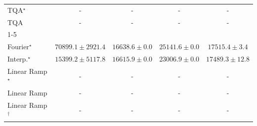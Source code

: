 \begin{tabular}{l|cccc|}
TQA$^\star$ & {\cellcolor[HTML]{000000}} \color[HTML]{F1F1F1} {\cellcolor{white}} \color{black} - & {\cellcolor[HTML]{000000}} \color[HTML]{F1F1F1} {\cellcolor{white}} \color{black} - & {\cellcolor[HTML]{000000}} \color[HTML]{F1F1F1} {\cellcolor{white}} \color{black} - & {\cellcolor[HTML]{000000}} \color[HTML]{F1F1F1} {\cellcolor{white}} \color{black} - \\
TQA & {\cellcolor[HTML]{000000}} \color[HTML]{F1F1F1} {\cellcolor{white}} \color{black} - & {\cellcolor[HTML]{000000}} \color[HTML]{F1F1F1} {\cellcolor{white}} \color{black} - & {\cellcolor[HTML]{000000}} \color[HTML]{F1F1F1} {\cellcolor{white}} \color{black} - & {\cellcolor[HTML]{000000}} \color[HTML]{F1F1F1} {\cellcolor{white}} \color{black} - \\
\cline{1-5}
\multicolumn{5}{c}{\rule{0pt}{8pt}PP} \\
\midrule
Fourier$^\star$ & {\cellcolor[HTML]{004529}} \color[HTML]{F1F1F1} $70899.1\pm 2921.4$ & {\cellcolor[HTML]{FBFDCF}} \color[HTML]{000000} $16638.6\pm 0.0$ & {\cellcolor[HTML]{E3F4AA}} \color[HTML]{000000} $25141.6\pm 0.0$ & {\cellcolor[HTML]{FAFDC9}} \color[HTML]{000000} $17515.4\pm 3.4$ \\
Interp.$^\star$ & {\cellcolor[HTML]{FCFED7}} \color[HTML]{000000} $15399.2\pm 5117.8$ & {\cellcolor[HTML]{FBFDCF}} \color[HTML]{000000} $16615.9\pm 0.0$ & {\cellcolor[HTML]{ECF7B1}} \color[HTML]{000000} $23006.9\pm 0.0$ & {\cellcolor[HTML]{FAFDC9}} \color[HTML]{000000} $17489.3\pm 12.8$ \\
Linear Ramp$^\star$ & {\cellcolor[HTML]{000000}} \color[HTML]{F1F1F1} {\cellcolor{white}} \color{black} - & {\cellcolor[HTML]{000000}} \color[HTML]{F1F1F1} {\cellcolor{white}} \color{black} - & {\cellcolor[HTML]{000000}} \color[HTML]{F1F1F1} {\cellcolor{white}} \color{black} - & {\cellcolor[HTML]{000000}} \color[HTML]{F1F1F1} {\cellcolor{white}} \color{black} - \\
Linear Ramp & {\cellcolor[HTML]{000000}} \color[HTML]{F1F1F1} {\cellcolor{white}} \color{black} - & {\cellcolor[HTML]{000000}} \color[HTML]{F1F1F1} {\cellcolor{white}} \color{black} - & {\cellcolor[HTML]{000000}} \color[HTML]{F1F1F1} {\cellcolor{white}} \color{black} - & {\cellcolor[HTML]{000000}} \color[HTML]{F1F1F1} {\cellcolor{white}} \color{black} - \\
Linear Ramp$^\dagger$ & {\cellcolor[HTML]{000000}} \color[HTML]{F1F1F1} {\cellcolor{white}} \color{black} - & {\cellcolor[HTML]{000000}} \color[HTML]{F1F1F1} {\cellcolor{white}} \color{black} - & {\cellcolor[HTML]{000000}} \color[HTML]{F1F1F1} {\cellcolor{white}} \color{black} - & {\cellcolor[HTML]{000000}} \color[HTML]{F1F1F1} {\cellcolor{white}} \color{black} - \\

\end{tabular}
